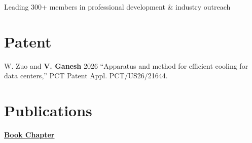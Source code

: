 \documentclass[]{Keval-resume}
\begin{document}
{{\hspace{1.5em} \textbullet{} Leading 300+ members in professional development \& industry outreach\\


\sectionsep

\section{Patent} 
\hrulefill

\begin{etaremune}
    \setlength{\itemsep}{0pt}
    \setlength{\parsep}{0pt}
\item W. Zuo and \textbf{V. Ganesh} 2026 “Apparatus and method for efficient cooling for data centers,” PCT Patent Appl. PCT/US26/21644. 
\end{etaremune}


\sectionsep


\section{Publications} 
\hrulefill
\postsectionsep 

\textbf{\underline{Book Chapter}}

}}
\end{document}
